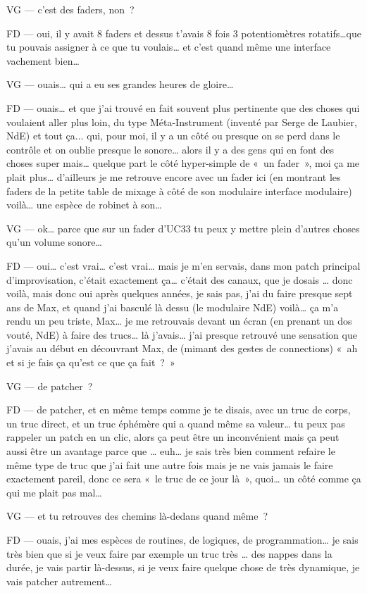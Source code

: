 VG —  c'est des faders, non ? 

FD —  oui, il y avait 8 faders et dessus t'avais 8 fois 3 potentiomètres rotatifs…que tu pouvais assigner à ce que tu voulais… et c'est quand même une interface vachement bien… 

VG —  ouais… qui a eu ses grandes heures de gloire… 

FD —  ouais… et que j'ai trouvé en fait souvent plus pertinente que des choses qui voulaient aller plus loin, du type Méta-Instrument (inventé par Serge de Laubier, NdE) et tout ça... qui, pour moi, il y a un côté ou presque on se perd dans le contrôle et on oublie presque le sonore… alors il y a des gens qui en font des choses super mais… quelque part le côté hyper-simple de « un fader », moi ça me plait plus… d'ailleurs je me retrouve encore avec un fader ici (en montrant les faders de la petite table de mixage à côté de son modulaire interface modulaire) voilà… une espèce de robinet à son…  

VG —  ok… parce que sur un fader d'UC33 tu peux y mettre plein d'autres choses qu'un volume sonore… 

FD —  oui… c'est vrai… c'est vrai… mais je m'en servais, dans mon patch principal d'improvisation, c'était exactement ça… c'était des canaux, que je dosais … donc voilà, mais donc oui après quelques années, je sais pas, j'ai du faire presque sept ans de Max, et quand j'ai basculé là dessu (le modulaire NdE) voilà… ça m'a rendu un peu triste, Max… je me retrouvais devant un écran (en prenant un dos vouté, NdE) à faire des trucs… là j'avais… j'ai presque retrouvé une sensation que j'avais au début en découvrant Max, de (mimant des gestes de connections) « ah et si je fais ça qu'est ce que ça fait ? »  

VG —  de patcher ? 

FD —  de patcher, et en même temps comme je te disais, avec un truc de corps, un truc direct, et un truc éphémère qui a quand même sa valeur… tu peux pas rappeler un patch en un clic, alors ça peut être un inconvénient mais ça peut aussi être un avantage parce que … euh… je sais très bien comment refaire le même type de truc que j'ai fait une autre fois mais je ne vais jamais le faire exactement pareil, donc ce sera « le truc de ce jour là », quoi… un côté comme ça qui me plait pas mal… 

VG —  et tu retrouves des chemins là-dedans quand même ? 

FD —  ouais, j'ai mes espèces de routines, de logiques, de programmation… je sais très bien que si je veux faire par exemple un truc très … des nappes dans la durée, je vais partir là-dessus, si je veux faire quelque chose de très dynamique, je vais patcher autrement… 

